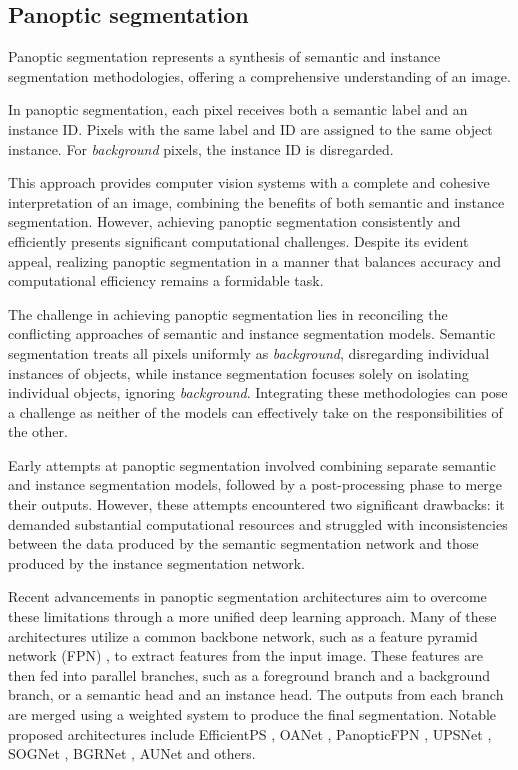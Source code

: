   \subsection{Panoptic segmentation}
Panoptic segmentation represents a synthesis of semantic and instance segmentation methodologies, offering a comprehensive understanding of an image.

In panoptic segmentation, each pixel receives both a semantic label and an instance ID. Pixels with the same label and ID are assigned to the same object instance. For \textit{background} pixels, the instance ID is disregarded.

This approach provides computer vision systems with a complete and cohesive interpretation of an image, combining the benefits of both semantic and instance segmentation. However, achieving panoptic segmentation consistently and efficiently presents significant computational challenges. Despite its evident appeal, realizing panoptic segmentation in a manner that balances accuracy and computational efficiency remains a formidable task.

The challenge in achieving panoptic segmentation lies in reconciling the conflicting approaches of semantic and
instance segmentation models. Semantic segmentation treats all pixels uniformly as \textit{background}, disregarding
individual instances of objects, while instance segmentation focuses solely on isolating individual objects, ignoring \textit{background}. Integrating these methodologies can pose a challenge as neither of the models can effectively take on the responsibilities of the other.

Early attempts at panoptic segmentation involved combining separate semantic and instance segmentation models,
followed by a post-processing phase to merge their outputs. However, these attempts encountered two significant
drawbacks: it
demanded substantial computational resources and struggled with inconsistencies between the data produced by the
semantic segmentation network and those produced by the instance segmentation network.

Recent advancements in panoptic segmentation architectures aim to overcome these limitations through a more unified deep learning approach. Many of these architectures utilize a common backbone network, such as a feature pyramid network (FPN) \cite{FPNLin2017}, to extract features from the input image. These features are then fed into parallel branches, such as a foreground branch and a background branch, or a semantic head and an instance head. The outputs from each branch are merged using a weighted system to produce the final segmentation. Notable proposed architectures include EfficientPS \cite{mohan2020efficientps}, OANet \cite{zhang2019oanet}, PanopticFPN \cite{kirillov2019panoptic}, UPSNet \cite{xiong2019upsnet}, SOGNet \cite{yang2019sognet}, BGRNet \cite{wu2020bidirectional}, AUNet \cite{sun2019aunet} and others.

